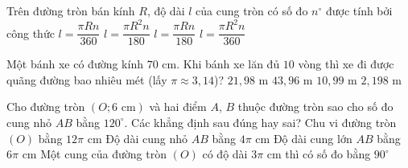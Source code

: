 

\begin{ex}%
	Trên đường tròn bán kính $R$, độ dài $l$ của cung tròn có số đo $n^\circ$ được tính bởi công thức
	\choice
	{$l=\dfrac{\pi Rn}{360}$}
	{$l=\dfrac{\pi R^2n}{180}$}
	{\True $l=\dfrac{\pi Rn}{180}$}
	{$l=\dfrac{\pi R^2n}{360}$}
\end{ex}

\begin{ex}%
	Một bánh xe có đường kính $70\text{ cm}$. Khi bánh xe lăn đủ $10$ vòng thì xe đi được quãng đường bao nhiêu mét (lấy $\pi\approx 3{,}14$)?
	\choice
	{\True $21{,}98\text{ m}$}
	{$43{,}96\text{ m}$}
	{$10{,}99\text{ m}$}
	{$2{,}198\text{ m}$}
\end{ex}

\begin{ex}%
	Cho đường tròn $(O;6\text{ cm})$ và hai điểm $A$, $B$ thuộc đường tròn sao cho số đo cung nhỏ $AB$ bằng $120^\circ$. Các khẳng định sau đúng hay sai?
	\choiceTF
	{\True Chu vi đường tròn $(O)$ bằng $12\pi\text{ cm}$}
	{\True Độ dài cung nhỏ $AB$ bằng $4\pi\text{ cm}$}
	{Độ dài cung lớn $AB$ bằng $6\pi\text{ cm}$}
	{\True Một cung của đường tròn $(O)$ có độ dài $3\pi\text{ cm}$ thì có số đo bằng $90^\circ$}
\end{ex}


